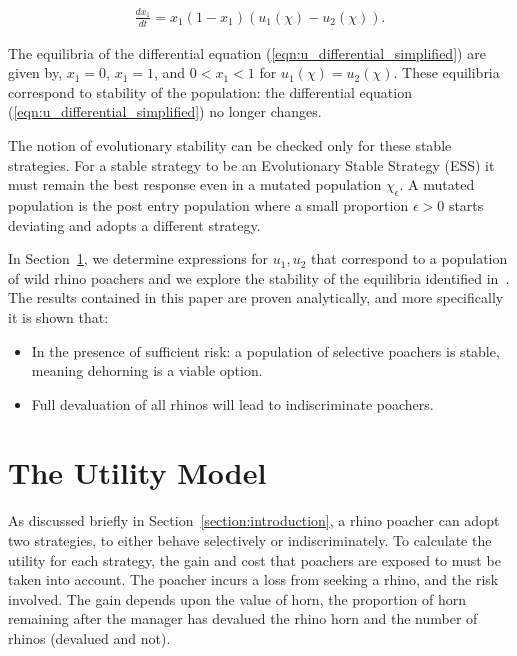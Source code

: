\documentclass[10pt]{article}
\begin{document}
\begin{eqnarray}
    \label{eqn:u_differential_simplified}
    \frac{dx_1}{dt}= x_1(1 - x_1)(u_1(\chi) - u_2(\chi)).
\end{eqnarray}

The equilibria of the differential equation (\ref{eqn:u_differential_simplified})
are given by, \(x_1=0\), \(x_1=1\), and \(0<x_1<1\) for \(u_1(\chi)=u_2(\chi)\).
These equilibria correspond to stability of the population: the differential
equation (\ref{eqn:u_differential_simplified}) no longer changes.

The notion of evolutionary stability can be checked only for these stable strategies.
For a stable strategy to be an Evolutionary Stable Strategy (ESS) it must remain
the best response even in a mutated population \(\chi_\epsilon\). A mutated population
is the post entry population
where a small proportion \(\epsilon > 0\) starts deviating and adopts a different strategy.

In Section~\ref{section:the_model}, we determine expressions
for \(u_1, u_2\) that correspond to a population of wild rhino poachers and we
explore the stability of the equilibria identified in~\cite{Lee}. The results
contained in this paper are proven analytically, and more specifically it is
shown that:

\begin{itemize}
    \item In the presence of sufficient risk: a population of selective poachers
        is stable, meaning dehorning is a viable option.
    \item Full devaluation of all rhinos will lead to indiscriminate poachers.
\end{itemize}

\section{The Utility Model}\label{section:the_model}

As discussed briefly in Section~\ref{section:introduction}, a rhino poacher
can adopt two strategies, to either behave selectively
or indiscriminately. To calculate the utility for each strategy, the gain and cost
that poachers are exposed to must be taken into account. The poacher incurs a
loss from seeking a rhino, and the risk involved. The gain depends upon the value
of horn, the proportion of horn remaining after the manager has devalued the
rhino horn and the number of rhinos (devalued and not).
\end{document}
